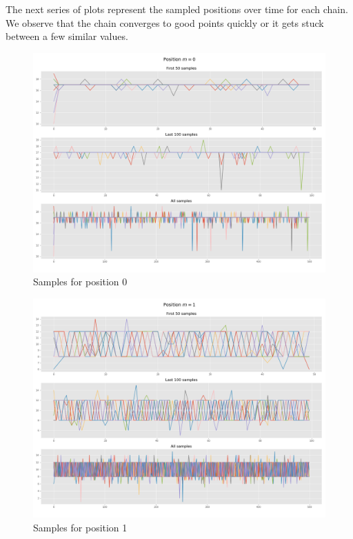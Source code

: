 \documentclass[]{article}
\begin{document}
	The next series of plots represent the sampled positions over time for each chain.
	We observe that the chain converges to good points quickly or it gets stuck between a few similar values. 
	
	\begin{figure}[H]
		\begin{center}
			
			\includegraphics[width=.7\textwidth]{task4/figures/T_2_4/Q2/convergence_pos0.png}
			\caption*{Samples for position 0}
		\end{center}
	\end{figure}
	
	\begin{figure}[H]
		\begin{center}
			
			\includegraphics[width=.7\textwidth]{task4/figures/T_2_4/Q2/convergence_pos1.png}
			\caption*{Samples for position 1}
		\end{center}
	\end{figure}
	
\end{document}
